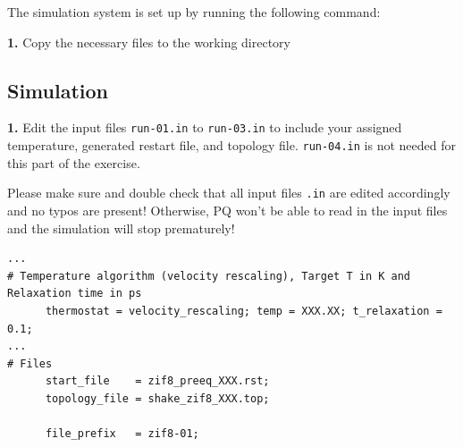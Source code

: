 \documentclass[
  letterpaper,
]{article}
\newenvironment{Shaded}{\begin{snugshade}}{\end{snugshade}}
\newcommand{\FunctionTok}[1]{\textcolor[rgb]{0.28,0.35,0.67}{#1}}
\newcommand{\NormalTok}[1]{\textcolor[rgb]{0.00,0.23,0.31}{#1}}
\newcommand{\OperatorTok}[1]{\textcolor[rgb]{0.37,0.37,0.37}{#1}}
\newcommand{\PreprocessorTok}[1]{\textcolor[rgb]{0.68,0.00,0.00}{#1}}
\newcommand{\VariableTok}[1]{\textcolor[rgb]{0.07,0.07,0.07}{#1}}
\begin{document}

The simulation system is set up by running the following command:

\textbf{1.} Copy the necessary files to the working directory

\begin{Shaded}
\end{Shaded}

\hypertarget{simulation-1}{%
\subsection*{Simulation}\label{simulation-1}}


\textbf{1.} Edit the input files \texttt{run-01.in} to
\texttt{run-03.in} to include your assigned temperature, generated
restart file, and topology file. \texttt{run-04.in} is not needed for
this part of the exercise.

\begin{tcolorbox}[enhanced jigsaw, toptitle=1mm, opacitybacktitle=0.6, colframe=quarto-callout-important-color-frame, toprule=.15mm, breakable, bottomrule=.15mm, left=2mm, title=\textcolor{quarto-callout-important-color}{\faExclamation}\hspace{0.5em}{Important}, titlerule=0mm, leftrule=.75mm, bottomtitle=1mm, coltitle=black, arc=.35mm, rightrule=.15mm, opacityback=0, colback=white, colbacktitle=quarto-callout-important-color!10!white]

Please make sure and double check that all input files \texttt{.in} are
edited accordingly and no typos are present! Otherwise, PQ won't be able
to read in the input files and the simulation will stop prematurely!

\end{tcolorbox}

\begin{verbatim}
...
# Temperature algorithm (velocity rescaling), Target T in K and Relaxation time in ps
      thermostat = velocity_rescaling; temp = XXX.XX; t_relaxation = 0.1;
...
# Files
      start_file    = zif8_preeq_XXX.rst;
      topology_file = shake_zif8_XXX.top;

      file_prefix   = zif8-01;
\end{verbatim}
\end{document}
